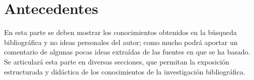 \chapter{Antecedentes}
\label{cap:Antecedentes}

En esta parte se deben mostrar los conocimientos obtenidos en la búsqueda bibliográfica y no ideas personales del autor; como mucho podrá aportar un comentario de algunas pocas ideas extraídas de las fuentes en que se ha basado. Se articulará esta parte en diversas secciones, que permitan la exposición estructurada y didáctica de los conocimientos de la investigación bibliográfica.